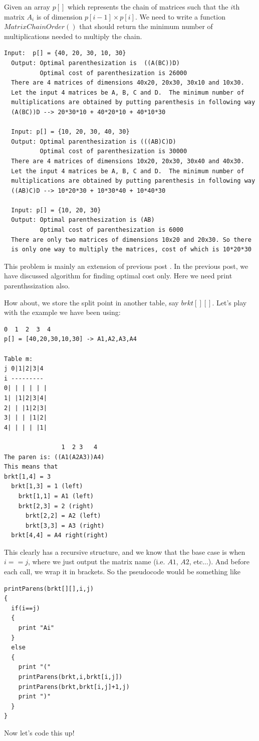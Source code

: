 Given an array $p[]$ which represents the chain of matrices such that the
$i$th matrix $A_i$ is of dimension $p[i-1]\times p[i]$. We need to write a
function $MatrixChainOrder()$ that should return the minimum number of
multiplications needed to multiply the chain.
\begin{lstlisting}[style=raygeneric]
  Input:  p[] = {40, 20, 30, 10, 30}  
  Output: Optimal parenthesization is  ((A(BC))D)
          Optimal cost of parenthesization is 26000
  There are 4 matrices of dimensions 40x20, 20x30, 30x10 and 10x30.
  Let the input 4 matrices be A, B, C and D.  The minimum number of 
  multiplications are obtained by putting parenthesis in following way
  (A(BC))D --> 20*30*10 + 40*20*10 + 40*10*30

  Input: p[] = {10, 20, 30, 40, 30} 
  Output: Optimal parenthesization is (((AB)C)D)
          Optimal cost of parenthesization is 30000
  There are 4 matrices of dimensions 10x20, 20x30, 30x40 and 40x30. 
  Let the input 4 matrices be A, B, C and D.  The minimum number of 
  multiplications are obtained by putting parenthesis in following way
  ((AB)C)D --> 10*20*30 + 10*30*40 + 10*40*30

  Input: p[] = {10, 20, 30}  
  Output: Optimal parenthesization is (AB)
          Optimal cost of parenthesization is 6000
  There are only two matrices of dimensions 10x20 and 20x30. So there 
  is only one way to multiply the matrices, cost of which is 10*20*30
\end{lstlisting}
This problem is mainly an extension of previous post
. In the previous post, we have discussed
algorithm for finding optimal cost only. Here we need print parenthssization
also.

\textbf{}

\RayNotesBegin

How about, we store the split point in another table, say $brkt[][]$. Let's
play with the example we have been using:
\begin{lstlisting}[style=raygeneric]
        0  1  2  3  4
p[] = [40,20,30,10,30] -> A1,A2,A3,A4

Table m:
j 0|1|2|3|4
i ---------
0| | | | | |
1| |1|2|3|4|
2| | |1|2|3|
3| | | |1|2|
4| | | | |1|

                1  2 3   4
The paren is: ((A1(A2A3))A4)
This means that 
brkt[1,4] = 3
  brkt[1,3] = 1 (left)
    brkt[1,1] = A1 (left)
    brkt[2,3] = 2 (right)
      brkt[2,2] = A2 (left)
      brkt[3,3] = A3 (right)
  brkt[4,4] = A4 right(right)
\end{lstlisting}
This clearly has a recursive structure, and we know that the base case is
when $i==j$, where we just output the matrix name (i.e. $A1$, $A2$, etc...). 
And before each call, we wrap it in brackets.
So the pseudocode would be something like
\begin{lstlisting}[style=pseudostyle,numbers=none]
printParens(brkt[][],i,j)
{
  if(i==j)
  {
    print "Ai"
  }
  else
  {
    print "("
    printParens(brkt,i,brkt[i,j])
    printParens(brkt,brkt[i,j]+1,j)
    print ")"
  }
}
\end{lstlisting}
Now let's code this up!

